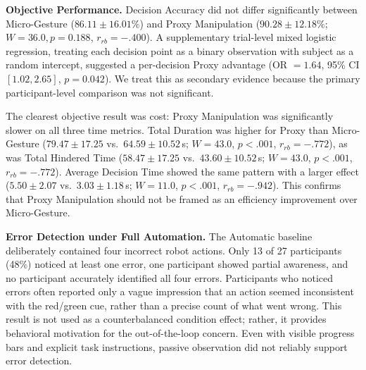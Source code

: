 \documentclass[sigconf,review,anonymous]{acmart}
\begin{document}
\textbf{Objective Performance.}
Decision Accuracy did not differ significantly between Micro-Gesture ($86.11 \pm 16.01\%$) and Proxy Manipulation ($90.28 \pm 12.18\%$; $W = 36.0, p =0.188$, $r_{rb}=-.400$). A supplementary trial-level mixed logistic regression, treating each decision point as a binary observation with subject as a random intercept, suggested a per-decision Proxy advantage (OR $= 1.64$, 95\% CI $[1.02, 2.65]$, $p =0.042$). We treat this as secondary evidence because the primary participant-level comparison was not significant.

The clearest objective result was cost: Proxy Manipulation was significantly slower on all three time metrics. Total Duration was higher for Proxy than Micro-Gesture ($79.47 \pm 17.25$ vs.\ $64.59 \pm 10.52$\,s; $W=43.0$, $p<.001$, $r_{rb}=-.772$), as was Total Hindered Time ($58.47 \pm 17.25$ vs.\ $43.60 \pm 10.52$\,s; $W=43.0$, $p<.001$, $r_{rb}=-.772$). Average Decision Time showed the same pattern with a larger effect ($5.50 \pm 2.07$ vs.\ $3.03 \pm 1.18$\,s; $W=11.0$, $p<.001$, $r_{rb}=-.942$). This confirms that Proxy Manipulation should not be framed as an efficiency improvement over Micro-Gesture.

\textbf{Error Detection under Full Automation.}
The Automatic baseline deliberately contained four incorrect robot actions. Only 13 of 27 participants (48\%) noticed at least one error, one participant showed partial awareness, and no participant accurately identified all four errors. Participants who noticed errors often reported only a vague impression that an action seemed inconsistent with the red/green cue, rather than a precise count of what went wrong. This result is not used as a counterbalanced condition effect; rather, it provides behavioral motivation for the out-of-the-loop concern. Even with visible progress bars and explicit task instructions, passive observation did not reliably support error detection.

\end{document}
